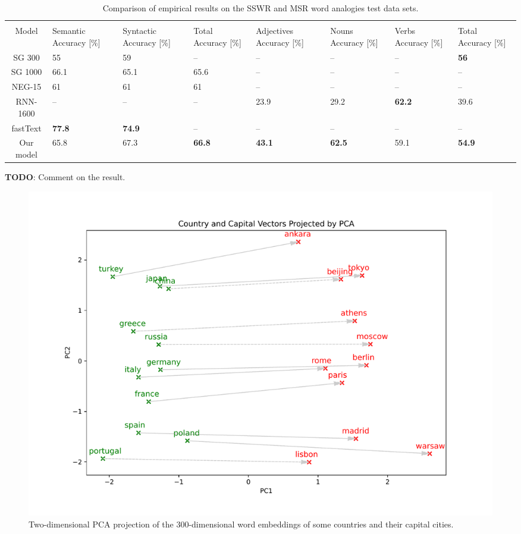 \begin{table}[ht]
    \centering
    \begin{tabular}{@{}cm{1.7cm}m{1.7cm}m{1.7cm}m{1.7cm}m{1.7cm}m{1.7cm}m{1.7cm}@{}}
    \toprule
    & \multicolumn{3}{c}{\cite[SSWR]{mikolov2013a}} & \multicolumn{4}{c}{ \cite[MSR]{mikolov-etal-2013-linguistic}} \\ \cmidrule(l){2-8} 
    \multirow{-2}{*}{Model} & Semantic Accuracy {[}\%{]} & Syntactic Accuracy {[}\%{]} & Total Accuracy {[}\%{]} & Adjectives Accuracy {[}\%{]} & Nouns Accuracy {[}\%{]} & Verbs Accuracy {[}\%{]} & Total Accuracy {[}\%{]} \\ \midrule
    \rowcolor[HTML]{F5F5F5}
    SG 300 & 55 & 59 & -- & -- & -- & -- & \textbf{56} \\
    SG 1000 & 66.1 & 65.1 & 65.6 & -- & -- & -- & -- \\
    \rowcolor[HTML]{F5F5F5}
    NEG-15 & 61 & 61 & 61 & -- & -- & -- & -- \\
    RNN-1600 & -- & -- & -- & 23.9 & 29.2 & \textbf{62.2} & 39.6 \\
    \rowcolor[HTML]{F5F5F5}
    fastText & \textbf{77.8} & \textbf{74.9} & -- & -- & -- & -- & -- \\
    Our model & 65.8 & 67.3 & \textbf{66.8} & \textbf{43.1} & \textbf{62.5} & 59.1 & \textbf{54.9} \\
    \bottomrule
    \end{tabular}
    \caption{Comparison of empirical results on the SSWR and MSR word analogies test data sets.}
    \label{table:word2vec-eval-empirical-results}
\end{table}

\textbf{TODO}: Comment on the result.

\begin{figure}[h]
   \centering
   \includegraphics[width=\textwidth]{thesis/figures/country-capital-pca-2d.pdf}
 \caption{Two-dimensional PCA projection of the 300-dimensional word embeddings of some countries and their capital cities.}
 \label{fig:country-capital-pca-2d}
\end{figure}

